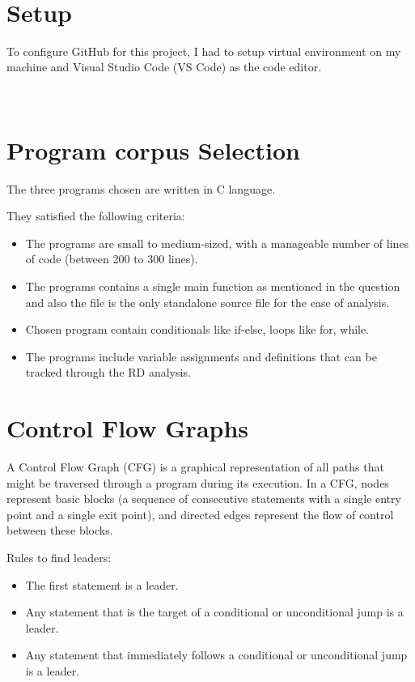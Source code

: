 \documentclass[12pt, a4paper]{report}
\begin{document}
\
\section{Setup}

To configure GitHub for this project, I had to setup virtual environment on my machine and Visual Studio Code (VS Code) as the code editor. 

\
\section{Program corpus Selection}

The three programs chosen are written in C language.

They satisfied the following criteria:
\begin{itemize}
    \item The programs are small to medium-sized, with a manageable number of lines of code (between 200 to 300 lines).
    \item The programs contains a single main function as mentioned in the question and also the file is the only standalone source file for the ease of analysis.
    \item Chosen program contain conditionals like if-else, loops like for, while.
    \item The programs include variable assignments and definitions that can be tracked through the RD analysis.
\end{itemize}

\section{Control Flow Graphs}

A Control Flow Graph (CFG) is a graphical representation of all paths that might be traversed through a program during its execution. In a CFG, nodes represent basic blocks (a sequence of consecutive statements with a single entry point and a single exit point), and directed edges represent the flow of control between these blocks.

Rules to find leaders:
\begin{itemize}
    \item The first statement is a leader.
    \item Any statement that is the target of a conditional or unconditional jump is a leader.
    \item Any statement that immediately follows a conditional or unconditional jump is a leader.
\end{itemize}
\end{document}
